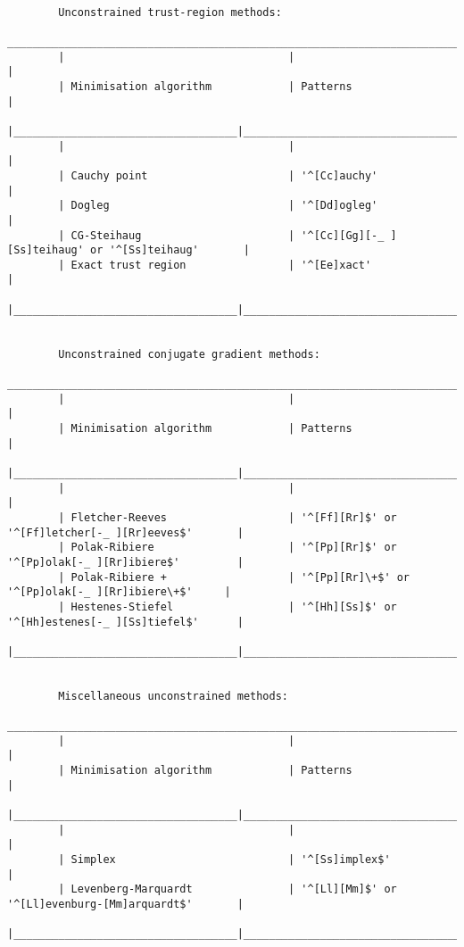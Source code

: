 \begin{verbatim}
    
        Unconstrained trust-region methods:
        ___________________________________________________________________________________________
        |                                   |                                                     |
        | Minimisation algorithm            | Patterns                                            |
        |___________________________________|_____________________________________________________|
        |                                   |                                                     |
        | Cauchy point                      | '^[Cc]auchy'                                        |
        | Dogleg                            | '^[Dd]ogleg'                                        |
        | CG-Steihaug                       | '^[Cc][Gg][-_ ][Ss]teihaug' or '^[Ss]teihaug'       |
        | Exact trust region                | '^[Ee]xact'                                         |
        |___________________________________|_____________________________________________________|
    
    
        Unconstrained conjugate gradient methods:
        ___________________________________________________________________________________________
        |                                   |                                                     |
        | Minimisation algorithm            | Patterns                                            |
        |___________________________________|_____________________________________________________|
        |                                   |                                                     |
        | Fletcher-Reeves                   | '^[Ff][Rr]$' or '^[Ff]letcher[-_ ][Rr]eeves$'       |
        | Polak-Ribiere                     | '^[Pp][Rr]$' or '^[Pp]olak[-_ ][Rr]ibiere$'         |
        | Polak-Ribiere +                   | '^[Pp][Rr]\+$' or '^[Pp]olak[-_ ][Rr]ibiere\+$'     |
        | Hestenes-Stiefel                  | '^[Hh][Ss]$' or '^[Hh]estenes[-_ ][Ss]tiefel$'      |
        |___________________________________|_____________________________________________________|
    
    
        Miscellaneous unconstrained methods:
        ___________________________________________________________________________________________
        |                                   |                                                     |
        | Minimisation algorithm            | Patterns                                            |
        |___________________________________|_____________________________________________________|
        |                                   |                                                     |
        | Simplex                           | '^[Ss]implex$'                                      |
        | Levenberg-Marquardt               | '^[Ll][Mm]$' or '^[Ll]evenburg-[Mm]arquardt$'       |
        |___________________________________|_____________________________________________________|
    

\end{verbatim}
